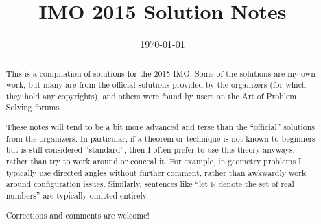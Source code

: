\documentclass[11pt]{scrartcl}
\title{IMO 2015 Solution Notes}
\date{\today}
\begin{document}
\maketitle

\begin{abstract}
This is a compilation of solutions
for the 2015 IMO.
Some of the solutions are my own work,
but many are from the official solutions provided by the organizers
(for which they hold any copyrights),
and others were found by users on the Art of Problem Solving forums.

These notes will tend to be a bit more advanced and terse than the ``official''
solutions from the organizers.
In particular, if a theorem or technique is not known to beginners
but is still considered ``standard'', then I often prefer to
use this theory anyways, rather than try to work around or conceal it.
For example, in geometry problems I typically use directed angles
without further comment, rather than awkwardly work around configuration issues.
Similarly, sentences like ``let $\mathbb{R}$ denote the set of real numbers''
are typically omitted entirely.

Corrections and comments are welcome!
\end{abstract}

\tableofcontents
\newpage

\addtocounter{section}{-1}
\end{document}
